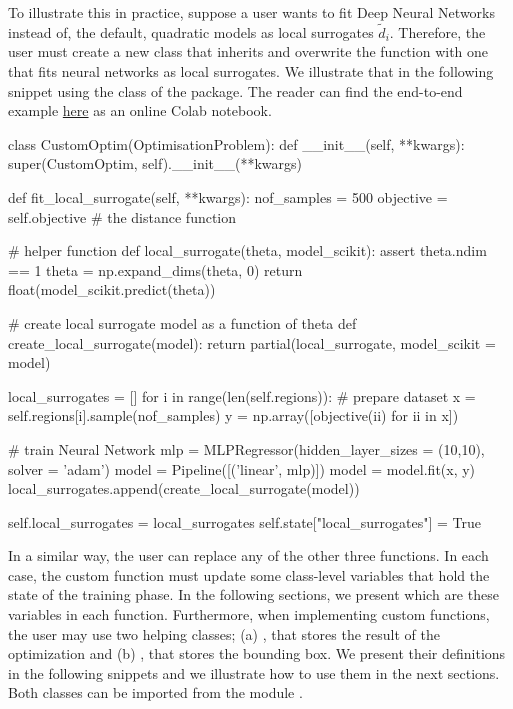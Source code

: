 \documentclass[article]{jss}
\begin{document}
To illustrate this in practice, suppose a user wants to fit Deep
Neural Networks instead of, the default, quadratic models as local
surrogates \(\tilde{d}_i\). Therefore, the user must create a new
class that inherits  and overwrite the
 function with one that fits
neural networks as local surrogates. We illustrate that in the
following snippet using the  class
of the  package. The reader can find the end-to-end
example
\href{https://colab.research.google.com/drive/1_jHVxPSH3XcNOORZJpLU0SPzs0PF8CQ5?usp=sharing}{here}
as an online Colab notebook.


\begin{Code}
class CustomOptim(OptimisationProblem):
    def __init__(self, **kwargs):
        super(CustomOptim, self).__init__(**kwargs)

    def fit_local_surrogate(self, **kwargs):
        nof_samples = 500
        objective = self.objective # the distance function

        # helper function
        def local_surrogate(theta, model_scikit):
            assert theta.ndim == 1
            theta = np.expand_dims(theta, 0)
            return float(model_scikit.predict(theta))

        # create local surrogate model as a function of theta
        def create_local_surrogate(model):
            return partial(local_surrogate, model_scikit = model)

        local_surrogates = []
        for i in range(len(self.regions)):
            # prepare dataset
            x = self.regions[i].sample(nof_samples)
            y = np.array([objective(ii) for ii in x])

            # train Neural Network
            mlp = MLPRegressor(hidden_layer_sizes = (10,10), solver = 'adam')
            model = Pipeline([('linear', mlp)])
            model = model.fit(x, y)
            local_surrogates.append(create_local_surrogate(model))

        self.local_surrogates = local_surrogates
        self.state["local_surrogates"] = True
\end{Code}

In a similar way, the user can replace any of the other three
functions. In each case, the custom function must update some
class-level variables that hold the state of the training phase. In
the following sections, we present which are these variables in each
function. Furthermore, when implementing custom functions, the user
may use two helping classes; (a) , that
stores the result of the optimization and (b) ,
that stores the bounding box. We present their definitions in the
following snippets and we illustrate how to use them in the next
sections. Both classes can be imported from the module
.
\end{document}
